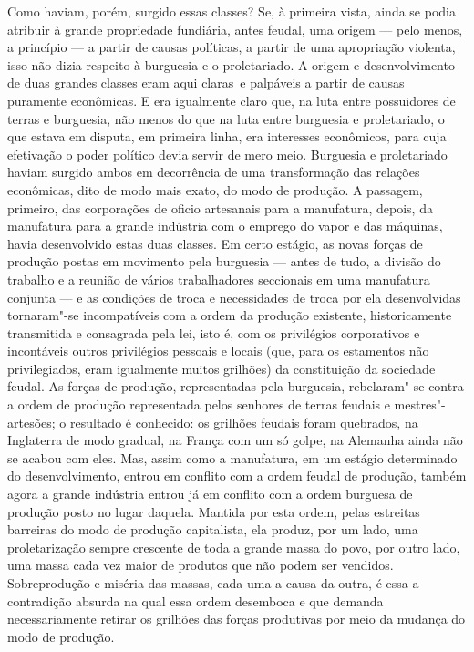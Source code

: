 Como haviam, porém, surgido essas classes? Se, à primeira vista, ainda
se podia atribuir à grande propriedade fundiária, antes feudal, uma
origem --- pelo menos, a princípio --- a partir de causas políticas, a
partir de uma apropriação violenta, isso não dizia respeito à burguesia
e o proletariado. A origem e desenvolvimento de duas grandes classes
eram aqui claras\est\ e palpáveis a partir de causas puramente econômicas. E
era igualmente claro que, na luta entre possuidores de terras e
burguesia, não menos do que na luta entre burguesia e proletariado, o
que estava em disputa, em primeira linha, era interesses econômicos,
para cuja efetivação o poder político devia servir de mero meio.
Burguesia e proletariado haviam surgido ambos em decorrência de uma
transformação das relações econômicas, dito de modo mais exato, do modo
de produção. A passagem, primeiro, das corporações de oficio artesanais
para a manufatura, depois, da manufatura para a grande indústria com o
emprego do vapor e das máquinas, havia desenvolvido estas duas classes.
Em certo estágio, as novas forças de produção postas em movimento pela
burguesia --- antes de tudo, a divisão do trabalho e a reunião de vários
trabalhadores seccionais em uma manufatura conjunta --- e as condições de
troca e necessidades de troca por ela desenvolvidas tornaram"-se
incompatíveis com a ordem da produção existente, historicamente
transmitida e consagrada pela lei, isto é, com os privilégios
corporativos e incontáveis outros privilégios pessoais e locais (que,
para os estamentos não privilegiados, eram igualmente muitos grilhões)
da constituição da sociedade feudal. As forças de produção,
representadas pela burguesia, rebelaram"-se contra a ordem de produção
representada pelos senhores de terras feudais e mestres"-artesões; o
resultado é conhecido: os grilhões feudais foram quebrados, na
Inglaterra de modo gradual, na França com um só golpe, na Alemanha ainda
não se acabou com eles. Mas, assim como a manufatura, em um estágio
determinado do desenvolvimento, entrou em conflito com a ordem feudal de
produção, também agora a grande indústria entrou já em conflito com a
ordem burguesa de produção posto no lugar daquela. Mantida por esta
ordem, pelas estreitas barreiras do modo de produção capitalista, ela
produz, por um lado, uma proletarização sempre crescente de toda a
grande massa do povo, por outro lado, uma massa cada vez maior de
produtos que não podem ser vendidos. Sobreprodução e miséria das massas,
cada uma a causa da outra, é essa a contradição absurda na qual essa
ordem desemboca e que demanda necessariamente retirar os grilhões das
forças produtivas por meio da mudança do modo de produção.

